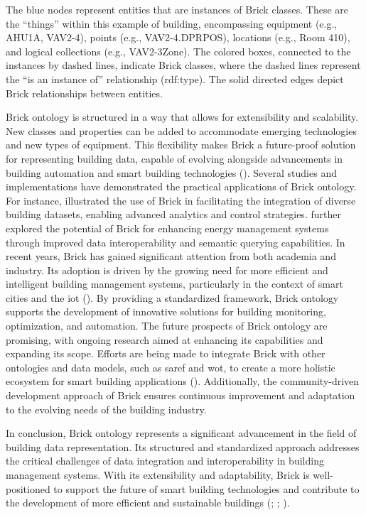 The blue nodes represent entities that are instances of Brick classes.
These are the ``things'' within this example of building, encompassing equipment (e.g., AHU1A, VAV2-4), points (e.g., VAV2-4.DPRPOS), locations (e.g., Room 410), and logical collections (e.g., VAV2-3Zone).
The colored boxes, connected to the instances by dashed lines, indicate Brick classes, where the dashed lines represent the ``is an instance of'' relationship (rdf:type).
The solid directed edges depict Brick relationships between entities.

Brick ontology is structured in a way that allows for extensibility and scalability.
New classes and properties can be added to accommodate emerging technologies and new types of equipment.
This flexibility makes Brick a future-proof solution for representing building data, capable of evolving alongside advancements in building automation and smart building technologies (\cite{Balaji2016}).
Several studies and implementations have demonstrated the practical applications of Brick ontology.
For instance, \cite{Balaji2016} illustrated the use of Brick in facilitating the integration of diverse building datasets, enabling advanced analytics and control strategies.
\cite{Balaji2018} further explored the potential of Brick for enhancing energy management systems through improved data interoperability and semantic querying capabilities.
In recent years, Brick has gained significant attention from both academia and industry.
Its adoption is driven by the growing need for more efficient and intelligent building management systems, particularly in the context of smart cities and the \gls{iot} (\cite{Balaji2016}).
By providing a standardized framework, Brick ontology supports the development of innovative solutions for building monitoring, optimization, and automation.
The future prospects of Brick ontology are promising, with ongoing research aimed at enhancing its capabilities and expanding its scope.
Efforts are being made to integrate Brick with other ontologies and data models, such as \gls{saref} and \gls{wot}, to create a more holistic ecosystem for smart building applications (\cite{Balaji2018}).
Additionally, the community-driven development approach of Brick ensures continuous improvement and adaptation to the evolving needs of the building industry.

In conclusion, Brick ontology represents a significant advancement in the field of building data representation.
Its structured and standardized approach addresses the critical challenges of data integration and interoperability in building management systems.
With its extensibility and adaptability, Brick is well-positioned to support the future of smart building technologies and contribute to the development of more efficient and sustainable buildings (\cite{Agarwal2012}; \cite{Balaji2016}; \cite{Balaji2018}).


